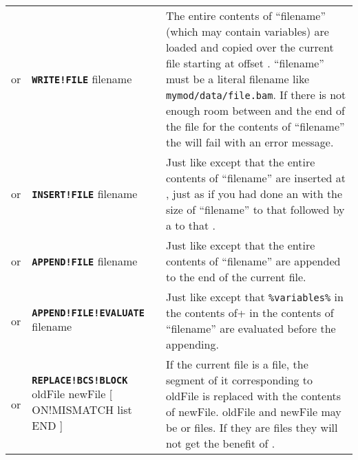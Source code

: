 \documentclass{article}
\def\ttref#1{\ahrefloc{#1}{\tt #1}}
\def\DEFINE#1{{\tt \bf #1}\label{#1}\index{#1}}
\def\t#1{{\tt #1}}
\def\Slist{{\color{red} list }}
\def\Ob{{\color{red} [ }}
\def\Oe{{\color{red} ] }}
\begin{document}
\begin{tabular}{cp{10in}|p{10in}}
or & \DEFINE{WRITE!FILE} \ttref{offset} filename &
  The entire contents of ``filename'' (which may contain variables) are
  loaded and copied over the current file starting at offset
  \ttref{offset}. ``filename'' must be a literal filename like
  \t{mymod/data/file.bam}. If there is not enough room between
  \ttref{offset} and the end of the file for the contents of ``filename''
  the \ttref{patch} will fail with an error message. \\
or & \DEFINE{INSERT!FILE} \ttref{offset} filename &
  Just like \ttref{WRITE!FILE} except that the entire contents of
  ``filename'' are inserted at \ttref{offset}, just as if you had done an
  \ttref{INSERT!BYTES} with the size of ``filename'' to that \ttref{offset}
  followed by a \ttref{WRITE!FILE} to that \ttref{offset}. \\
or & \DEFINE{APPEND!FILE} filename &
  Just like \ttref{INSERT!FILE} except that the entire contents of
  ``filename'' are appended to the end of the current file. \\
or & \DEFINE{APPEND!FILE!EVALUATE} filename &
  Just like \ttref{APPEND!FILE} except that \verb+%variables%+ in the contents of
  ``filename'' are evaluated before the appending. \\
or & \DEFINE{REPLACE!BCS!BLOCK} oldFile newFile \Ob ON!MISMATCH \ttref{patch} \Slist END \Oe &
  If the current file is a \ttref{BCS} file, the segment of it
  corresponding to oldFile is replaced with the contents of newFile. 
  oldFile and newFile may be \ttref{BCS} or \ttref{BAF} files. If they
  are \ttref{BAF} files they will not get the benefit of \ttref{AUTO!TRA}.
  
  
  

\end{tabular}
\end{document}
